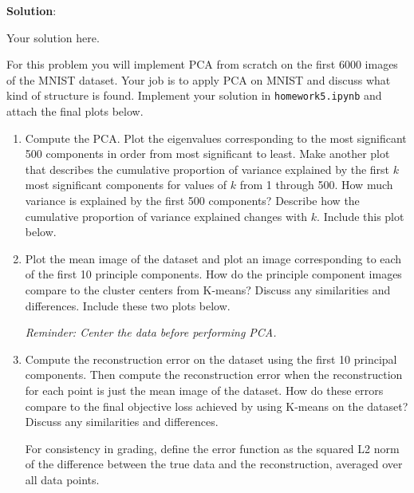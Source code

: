 \documentclass[submit]{../harvardml}
\newenvironment{solution}{
    \vspace{2mm}
    \color{blue}\noindent\textbf{Solution}:
}{}
\begin{document}
\begin{solution}
	Your solution here.
\end{solution}

\newpage




\begin{problem}

  For this problem you will implement PCA from scratch on the first 6000 images of the MNIST dataset. Your job is to apply PCA on MNIST and discuss what kind of structure is found. Implement your solution in \texttt{homework5.ipynb} and attach the final plots below. \\

  \begin{enumerate}

    \item Compute the PCA. Plot the eigenvalues corresponding to the most
    significant 500 components in order from most significant to
    least. Make another plot that describes the cumulative proportion of
    variance explained by the first $k$ most significant components for
    values of $k$ from 1 through 500.  How much variance is explained by
    the first 500 components?  Describe how the cumulative proportion of
    variance explained changes with $k$.  Include this plot below.

    \item Plot the mean image of the dataset and plot an image
    corresponding to each of the first 10 principle components.  How do
    the principle component images compare to the cluster centers from
    K-means? Discuss any similarities and differences.  Include these
    two plots below.
    
    \textit{Reminder: Center the data before performing PCA.}

    \item Compute the reconstruction error on the dataset using the first 10 principal components. Then compute the reconstruction error when the reconstruction for each point is just the mean
    image of the dataset. How do these errors compare to
    the final objective loss achieved by using K-means on the dataset?
    Discuss any similarities and differences.

    For consistency in grading, define the error function as the squared L2
    norm of the difference between the true data and the reconstruction, averaged over all data points.
  

\end{enumerate}
\end{problem}
\end{document}
